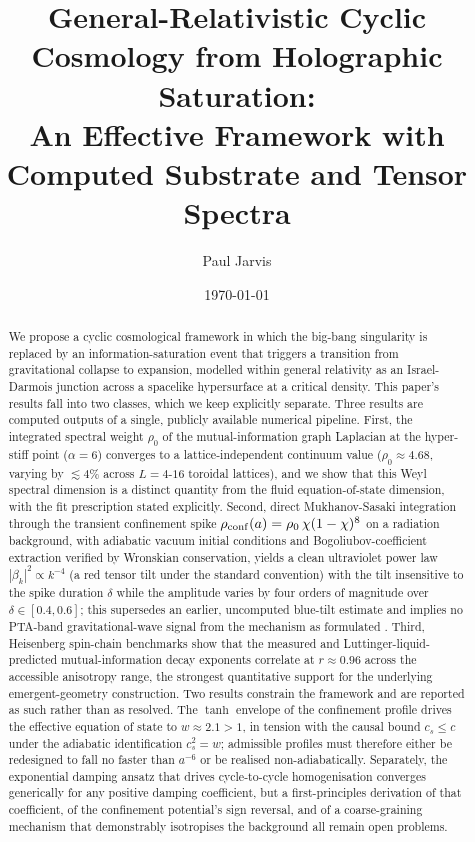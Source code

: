 \documentclass[reprint,superscriptaddress,amsmath,amssymb,aps,prd,showkeys,nofootinbib]{revtex4-2}
\begin{document}
\title{General-Relativistic Cyclic Cosmology from Holographic Saturation:\\
An Effective Framework with Computed Substrate and Tensor Spectra}

\author{Paul Jarvis}
\date{\today}

\begin{abstract}
We propose a cyclic cosmological framework in which the big-bang singularity is replaced by
an information-saturation event that triggers a transition from gravitational collapse to
expansion, modelled within general relativity as an Israel-Darmois junction across a
spacelike hypersurface at a critical density. This paper's results fall into two classes,
which we keep explicitly separate. Three results are computed outputs of a single,
publicly available numerical pipeline. First, the integrated spectral weight $\rho_0$ of the
mutual-information graph Laplacian at the hyper-stiff point ($\alpha=6$) converges to a
lattice-independent continuum value ($\rho_0 \approx 4.68$, varying by $\lesssim 4\%$ across
$L=4$-$16$ toroidal lattices), and we show that this Weyl spectral dimension is a distinct
quantity from the fluid equation-of-state dimension, with the fit prescription stated
explicitly. Second, direct Mukhanov-Sasaki integration through the transient confinement
spike $\rho_{\rm conf}(a)=\rho_0\,\chi(1-\chi)^8$ on a radiation background, with adiabatic
vacuum initial conditions and Bogoliubov-coefficient extraction verified by Wronskian
conservation, yields a clean ultraviolet power law $|\beta_k|^2 \propto k^{-4}$ (a red
tensor tilt under the standard convention) with the tilt insensitive to the spike duration
$\delta$ while the amplitude varies by four orders of magnitude over $\delta\in[0.4,0.6]$;
this supersedes an earlier, uncomputed blue-tilt estimate and implies no PTA-band
gravitational-wave signal from the mechanism as formulated \cite{NANOGrav15yr}. Third,
Heisenberg spin-chain benchmarks show that the measured and Luttinger-liquid-predicted
mutual-information decay exponents correlate at $r\approx0.96$ across the accessible
anisotropy range, the strongest quantitative support for the underlying emergent-geometry
construction. Two results constrain the framework and are reported as such rather than as
resolved. The $\tanh$ envelope of the confinement profile drives the effective equation of
state to $w\approx2.1>1$, in tension with the causal bound $c_s\leq c$ under the adiabatic
identification $c_s^2=w$; admissible profiles must therefore either be redesigned to fall no
faster than $a^{-6}$ or be realised non-adiabatically. Separately, the exponential damping
ansatz that drives cycle-to-cycle homogenisation converges generically for any positive
damping coefficient, but a first-principles derivation of that coefficient, of the
confinement potential's sign reversal, and of a coarse-graining mechanism that demonstrably
isotropises the background all remain open problems.
\end{abstract}
\end{document}
